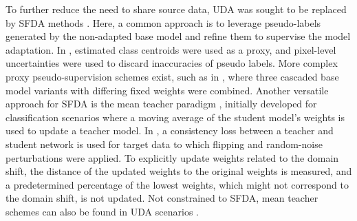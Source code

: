         To further reduce the need to share source data, UDA was sought to be replaced by SFDA methods \citep{yang2022source,wen2023source,chen2021source}.
        Here, a common approach is to leverage pseudo-labels generated by the non-adapted base model and refine them to supervise the model adaptation. In \citep{chen2021source}, estimated class centroids were used as a proxy, and pixel-level uncertainties were used to discard inaccuracies of pseudo labels.
        More complex proxy pseudo-supervision schemes exist, such as in \citep{yang2022source}, where three cascaded base model variants with differing fixed weights were combined.
        Another versatile approach for SFDA is the mean teacher paradigm \citep{tarvainen2017mean}, initially developed for classification scenarios where a moving average of the student model’s weights is used to update a teacher model. In \citep{wen2023source}, a consistency loss between a teacher and student network is used for target data to which flipping and random-noise perturbations were applied. To explicitly update weights related to the domain shift, the distance of the updated weights to the original weights is measured, and a predetermined percentage of the lowest weights, which might not correspond to the domain shift, is not updated. Not constrained to SFDA, mean teacher schemes can also be found in UDA scenarios \citep{perone2019unsupervised}.
